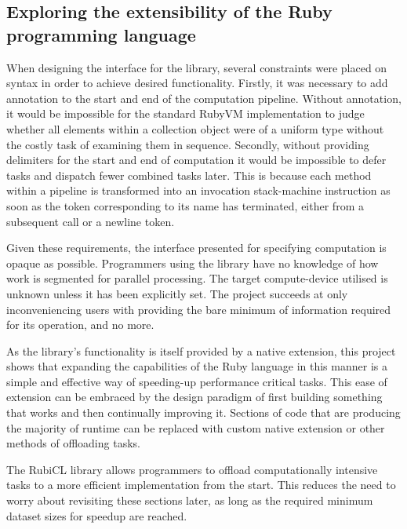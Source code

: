 \subsection{Exploring the extensibility of the Ruby programming language}
When designing the interface for the library, several constraints were placed on syntax in order to achieve desired functionality. Firstly, it was necessary to add annotation to the start and end of the computation pipeline. Without annotation, it would be impossible for the standard RubyVM implementation to judge whether all elements within a collection object were of a uniform type without the costly task of examining them in sequence. Secondly, without providing delimiters for the start and end of computation it would be impossible to defer tasks and dispatch fewer combined tasks later. This is because each method within a pipeline is transformed into an invocation stack-machine instruction as soon as the token corresponding to its name has terminated, either from a subsequent call or a newline token.

Given these requirements, the interface presented for specifying computation is opaque as possible. Programmers using the library have no knowledge of how work is segmented for parallel processing. The target compute-device utilised is unknown unless it has been explicitly set. The project succeeds at only inconveniencing users with providing the bare minimum of information required for its operation, and no more.

As the library's functionality is itself provided by a native extension, this project shows that expanding the capabilities of the Ruby language in this manner is a simple and effective way of speeding-up performance critical tasks. This ease of extension can be embraced by the design paradigm of first building something that works and then continually improving it. Sections of code that are producing the majority of runtime can be replaced with custom native extension or other methods of offloading tasks.

The RubiCL library allows programmers to offload computationally intensive tasks to a more efficient implementation from the start. This reduces the need to worry about revisiting these sections later, as long as the required minimum dataset sizes for speedup are reached.

